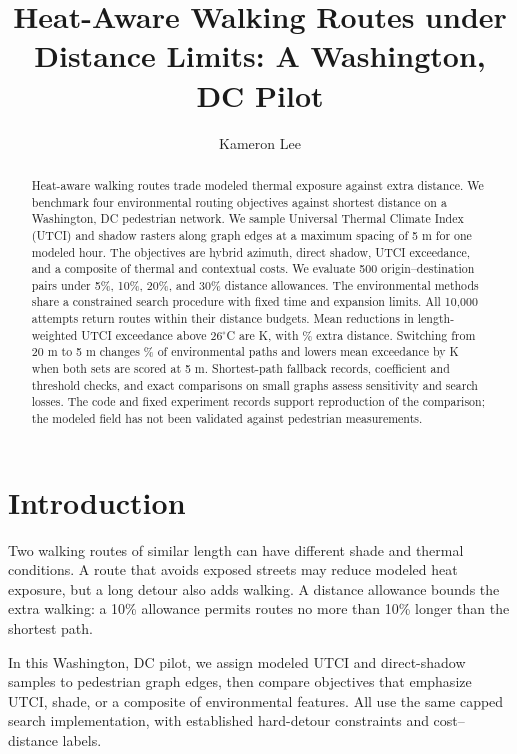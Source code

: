 \documentclass[sigconf,nonacm]{acmart}
\begin{document}
\title[Heat-Aware Walking Routes]{Heat-Aware Walking Routes under Distance Limits: A Washington, DC Pilot}
\author{Kameron Lee}

\begin{abstract}
Heat-aware walking routes trade modeled thermal exposure against extra distance. We benchmark four environmental routing objectives against shortest distance on a Washington, DC pedestrian network. We sample Universal Thermal Climate Index (UTCI) and shadow rasters along graph edges at a maximum spacing of 5 m for one modeled hour. The objectives are hybrid azimuth, direct shadow, UTCI exceedance, and a composite of thermal and contextual costs. We evaluate 500 origin--destination pairs under 5\%, 10\%, 20\%, and 30\% distance allowances. The environmental methods share a constrained search procedure with fixed time and expansion limits. All 10,000 attempts return routes within their distance budgets. Mean reductions in length-weighted UTCI exceedance above $26^\circ$C are \HeatRange{} K, with \DistanceRange{}\% extra distance. Switching from 20 m to 5 m changes \FullChangedRange{}\% of environmental paths and lowers mean exceedance by \FullGainRange{} K when both sets are scored at 5 m. Shortest-path fallback records, coefficient and threshold checks, and exact comparisons on small graphs assess sensitivity and search losses. The code and fixed experiment records support reproduction of the comparison; the modeled field has not been validated against pedestrian measurements.
\end{abstract}
\maketitle

\section{Introduction}
Two walking routes of similar length can have different shade and thermal conditions. A route that avoids exposed streets may reduce modeled heat exposure, but a long detour also adds walking. A distance allowance bounds the extra walking: a 10\% allowance permits routes no more than 10\% longer than the shortest path.

In this Washington, DC pilot, we assign modeled UTCI and direct-shadow samples to pedestrian graph edges, then compare objectives that emphasize UTCI, shade, or a composite of environmental features. All use the same capped search implementation, with established hard-detour constraints and cost--distance labels.
\end{document}
